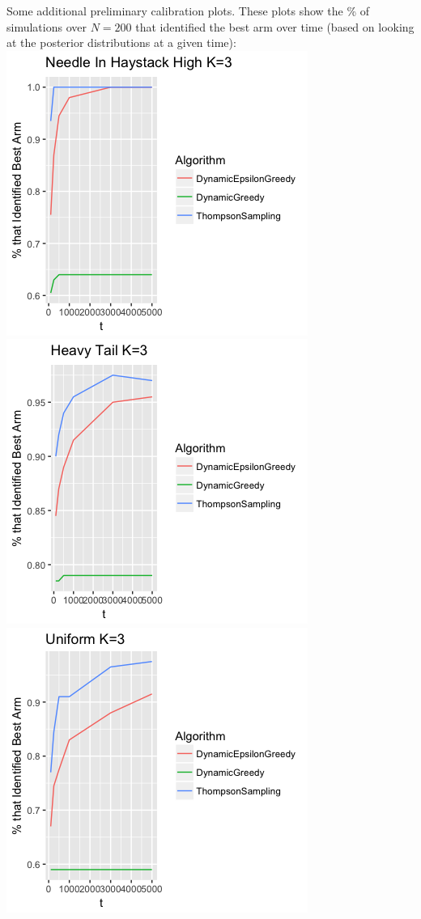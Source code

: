 \documentclass[11pt,letterpaper]{article}
\begin{document}
Some additional preliminary calibration plots. These plots show the \% of simulations over $N=200$ that identified the best arm over time (based on looking at the posterior distributions at a given time): \\
\includegraphics[scale=0.5]{"preliminary_nih_3_arms"} \\
\includegraphics[scale=0.5]{"preliminary_best_arm_heavy_tail_3"}
\includegraphics[scale=0.5]{"uniform_best_arm_identification_3_arms"} \\
\end{document}
